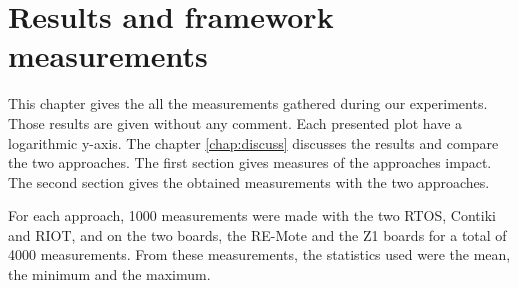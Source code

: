 \chapter{Results and framework measurements \label{chap:results}}

This chapter gives the all the measurements gathered during our experiments.
Those results are given without any comment.
Each presented plot have a logarithmic y-axis.
The chapter \ref{chap:discuss} discusses the results and compare the two approaches.
The first section gives measures of the approaches impact.
The second section gives the obtained measurements with the two approaches.

For each approach, 1000 measurements were made with the two RTOS, Contiki and RIOT, and on the two boards, the RE-Mote and the Z1 boards for a total of 4000 measurements. 
From these measurements, the statistics used were the mean, the minimum and the maximum.



